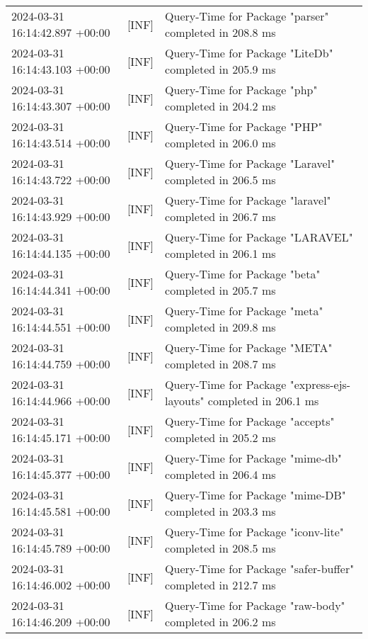 {{\begin{tabularx}{\textwidth}{|l|l|X|}
                    2024-03-31 16:14:42.897 +00:00 & [INF] & Query-Time for Package "parser" completed in 208.8 ms \\
                    2024-03-31 16:14:43.103 +00:00 & [INF] & Query-Time for Package "LiteDb" completed in 205.9 ms \\
                    2024-03-31 16:14:43.307 +00:00 & [INF] & Query-Time for Package "php" completed in 204.2 ms \\
                    2024-03-31 16:14:43.514 +00:00 & [INF] & Query-Time for Package "PHP" completed in 206.0 ms \\
                    2024-03-31 16:14:43.722 +00:00 & [INF] & Query-Time for Package "Laravel" completed in 206.5 ms \\
                    2024-03-31 16:14:43.929 +00:00 & [INF] & Query-Time for Package "laravel" completed in 206.7 ms \\
                    2024-03-31 16:14:44.135 +00:00 & [INF] & Query-Time for Package "LARAVEL" completed in 206.1 ms \\
                    2024-03-31 16:14:44.341 +00:00 & [INF] & Query-Time for Package "beta" completed in 205.7 ms \\
                    2024-03-31 16:14:44.551 +00:00 & [INF] & Query-Time for Package "meta" completed in 209.8 ms \\
                    2024-03-31 16:14:44.759 +00:00 & [INF] & Query-Time for Package "META" completed in 208.7 ms \\
                    2024-03-31 16:14:44.966 +00:00 & [INF] & Query-Time for Package "express-ejs-layouts" completed in 206.1 ms \\
                    2024-03-31 16:14:45.171 +00:00 & [INF] & Query-Time for Package "accepts" completed in 205.2 ms \\
                    2024-03-31 16:14:45.377 +00:00 & [INF] & Query-Time for Package "mime-db" completed in 206.4 ms \\
                    2024-03-31 16:14:45.581 +00:00 & [INF] & Query-Time for Package "mime-DB" completed in 203.3 ms \\
                    2024-03-31 16:14:45.789 +00:00 & [INF] & Query-Time for Package "iconv-lite" completed in 208.5 ms \\
                    2024-03-31 16:14:46.002 +00:00 & [INF] & Query-Time for Package "safer-buffer" completed in 212.7 ms \\
                    2024-03-31 16:14:46.209 +00:00 & [INF] & Query-Time for Package "raw-body" completed in 206.2 ms \\

\end{tabularx}}}
